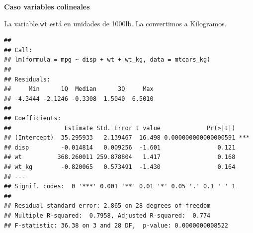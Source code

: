 \documentclass[
  12pt,
]{book}
\newenvironment{Shaded}{\begin{snugshade}}{\end{snugshade}}
\newcommand{\DataTypeTok}[1]{\textcolor[rgb]{0.13,0.29,0.53}{#1}}
\newcommand{\DecValTok}[1]{\textcolor[rgb]{0.00,0.00,0.81}{#1}}
\newcommand{\FloatTok}[1]{\textcolor[rgb]{0.00,0.00,0.81}{#1}}
\newcommand{\KeywordTok}[1]{\textcolor[rgb]{0.13,0.29,0.53}{\textbf{#1}}}
\newcommand{\NormalTok}[1]{#1}
\newcommand{\OperatorTok}[1]{\textcolor[rgb]{0.81,0.36,0.00}{\textbf{#1}}}
\newcommand{\StringTok}[1]{\textcolor[rgb]{0.31,0.60,0.02}{#1}}
\theoremstyle{definition}
\theoremstyle{definition}
\theoremstyle{definition}
\theoremstyle{remark}
\begin{document}
\textbf{Caso variables colineales}

La variable \texttt{wt} está en unidades de 1000lb. La convertimos a Kilogramos.

\begin{Shaded}
\end{Shaded}

\begin{verbatim}
## 
## Call:
## lm(formula = mpg ~ disp + wt + wt_kg, data = mtcars_kg)
## 
## Residuals:
##     Min      1Q  Median      3Q     Max 
## -4.3444 -2.1246 -0.3308  1.5040  6.5010 
## 
## Coefficients:
##               Estimate Std. Error t value             Pr(>|t|)    
## (Intercept)  35.295933   2.139467  16.498 0.000000000000000591 ***
## disp         -0.014814   0.009256  -1.601                0.121    
## wt          368.260011 259.878804   1.417                0.168    
## wt_kg        -0.820065   0.573491  -1.430                0.164    
## ---
## Signif. codes:  0 '***' 0.001 '**' 0.01 '*' 0.05 '.' 0.1 ' ' 1
## 
## Residual standard error: 2.865 on 28 degrees of freedom
## Multiple R-squared:  0.7958, Adjusted R-squared:  0.774 
## F-statistic: 36.38 on 3 and 28 DF,  p-value: 0.0000000008522
\end{verbatim}

\begin{Shaded}
\end{Shaded}
\end{document}
